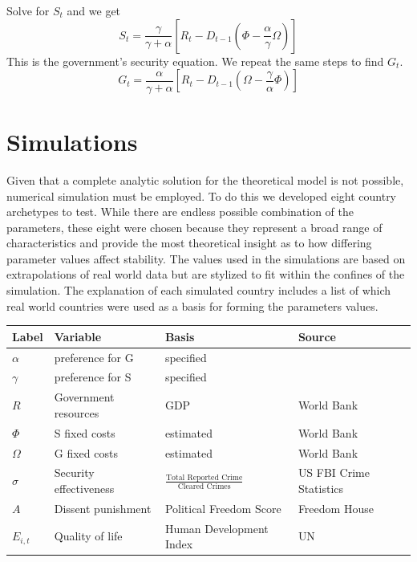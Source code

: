 \documentclass[12pt]{article}
\begin{document}
\begin{spacing}{1.5}
\noindent Solve for $S_t$ and we get
\begin{equation}
S_t=\frac{\gamma }{\gamma  +\alpha} \left[ R_t - D_{t-1} \left(\Phi - \frac{\alpha}{\gamma }\Omega \right) \right]
\end{equation}
\noindent This is the government's security equation. We repeat the same steps to find $G_t$. 
\begin{equation}
G_t=\frac{\alpha}{\gamma  +\alpha} \left[ R_t - D_{t-1} \left(\Omega - \frac{\gamma }{\alpha}\Phi \right) \right]
\end{equation}


\section{Simulations} 


Given that a complete analytic solution for the theoretical model is not possible, numerical simulation must be employed. To do this we developed eight country archetypes to test. While there are endless possible combination of the parameters, these eight were chosen because they represent a broad range of characteristics and provide the most theoretical insight as to how differing parameter values affect stability. The values used in the simulations are based on extrapolations of real world data but are stylized to fit within the confines of the simulation. The explanation of each simulated country includes a list of which real world countries were used as a basis for forming the parameters values. 

\begin{table}[]
\centering
\footnotesize

\begin{tabular}{llll}
\toprule
\textbf{Label} & \textbf{Variable} & \textbf{Basis} & \textbf{Source} \\ \hline
$\alpha$ & preference for G & specified &  \\
\textbf{$\gamma$} & preference for S & specified &  \\
\textbf{$R$} & Government resources & GDP & World Bank \\
$\Phi$ & S fixed costs & estimated & World Bank \\
\textbf{$\Omega$} & G fixed costs & estimated & World Bank \\
\textbf{$\sigma$} & Security effectiveness & $\frac{\text{Total Reported Crime}}{\text{Cleared Crimes}}$ & US FBI Crime Statistics \\
\textbf{$A$} & Dissent punishment & Political Freedom Score & Freedom House \\
\textbf{$E_{i,t}$} & Quality of life & Human Development Index & UN \\ \hline


\end{tabular}
\end{table}
\end{spacing}
\end{document}
